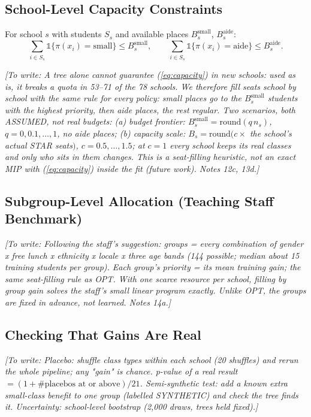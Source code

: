 \documentclass[11pt]{article}
\newcommand{\placeholder}[1]{\par\noindent\textit{[To write: #1]}\par}
\begin{document}
\subsection{School-Level Capacity Constraints}
For school $s$ with students $S_s$ and available places $B_s^{\mathrm{small}}$,
$B_s^{\mathrm{aide}}$:
\begin{equation}
\sum_{i\in S_s}\mathbb{1}\{\pi(x_i)=\mathrm{small}\}\leq B_s^{\mathrm{small}},\qquad
\sum_{i\in S_s}\mathbb{1}\{\pi(x_i)=\mathrm{aide}\}\leq B_s^{\mathrm{aide}}.
\label{eq:capacity}
\end{equation}
\placeholder{A tree alone cannot guarantee (\ref{eq:capacity}) in new schools: used as is,
it breaks a quota in 53--71 of the 78 schools. We therefore fill seats school by school
with the same rule for every policy: small places go to the $B_s^{\mathrm{small}}$
students with the highest priority, then aide places, the rest regular. Two scenarios,
both ASSUMED, not real budgets:
(a) budget frontier: $B_s^{\mathrm{small}}=\mathrm{round}(q\,n_s)$, $q=0,0.1,\dots,1$,
no aide places;
(b) capacity scale: $B_s = \mathrm{round}(c\times$ the school's actual STAR seats$)$,
$c=0.5,\dots,1.5$; at $c=1$ every school keeps its real classes and only who sits in them
changes. This is a seat-filling heuristic, not an exact MIP with (\ref{eq:capacity})
inside the fit (future work). Notes 12c, 13d.}

\subsection{Subgroup-Level Allocation (Teaching Staff Benchmark)}
\placeholder{Following the staff's suggestion: groups = every combination of gender x
free lunch x ethnicity x locale x three age bands (144 possible; median about 15 training
students per group). Each group's priority = its mean training gain; the same seat-filling
rule as OPT. With one scarce resource per school, filling by group gain solves the staff's
small linear program exactly. Unlike OPT, the groups are fixed in advance, not learned.
Notes 14a.}

\subsection{Checking That Gains Are Real}
\placeholder{Placebo: shuffle class types within each school (20 shuffles) and rerun the
whole pipeline; any "gain" is chance. p-value of a real result $=(1+\#\text{placebos at or
above})/21$. Semi-synthetic test: add a known extra small-class benefit to one group
(labelled SYNTHETIC) and check the tree finds it. Uncertainty: school-level bootstrap
(2,000 draws, trees held fixed).}
\end{document}
